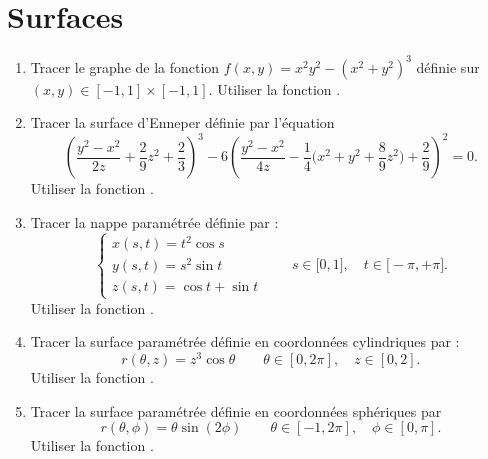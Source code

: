 \section{Surfaces}

\begin{frame}


\begin{tp}
\begin{enumerate}
  \item Tracer le graphe de la fonction $f(x,y)= x^2y^2-(x^2+y^2)^3$ définie
  sur $(x,y) \in [-1,1]\times[-1,1]$. Utiliser la fonction .
  \pause 
  \item Tracer la surface d'Enneper
  définie par l'équation 
  {
  \small
  $$\left( \frac{y^2-x^2}{2z}+\frac29z^2+\frac23\right)^3-
  6\left( \frac{y^2-x^2}{4z}-\frac14\big(x^2+y^2+\frac89z^2\big)+\frac29 \right)^2=0.$$
  }
  Utiliser la fonction .
  \pause
  
  \item Tracer la nappe paramétrée définie par :
  $$\left\{
  \begin{array}{l}
  x(s,t) =  t^2 \cos s\\[1mm]
  y(s,t) =  s^2 \sin t\\[1mm]
  z(s,t) = \cos t+ \sin t
  \end{array}
  \right.\qquad  s \in \big[0,1\big], \quad t \in \big[-\pi,+\pi\big].
  $$
  Utiliser la fonction .
  
\end{enumerate}
\end{tp}


\end{frame}

\begin{frame}

\begin{tp}
\begin{enumerate}
  \setcounter{enumi}{3}
  \item Tracer la surface paramétrée définie en coordonnées cylindriques par :
  $$r(\theta,z) = z^3 \cos \theta \qquad \theta \in [0,2\pi], \quad z \in [0,2].$$  
  Utiliser la fonction .
 
  \pause 
  \item Tracer la surface paramétrée définie en coordonnées sphériques par 
  $$r(\theta,\phi)  = \theta \sin(2\phi) \qquad \theta \in [-1,2\pi], \quad  \phi \in [0,\pi].$$
  Utiliser la fonction .  
\end{enumerate}
\end{tp}


\end{frame}


